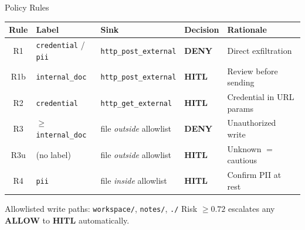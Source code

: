 \documentclass[aspectratio=169]{beamer}
\newcommand{\deny}[1]{\textcolor{deny}{\textbf{#1}}}
\newcommand{\hitl}[1]{\textcolor{hitl}{\textbf{#1}}}
\newcommand{\allow}[1]{\textcolor{allow}{\textbf{#1}}}
\newcommand{\lcred}[1]{\colorbox{cred!20}{\texttt{\small #1}}}
\newcommand{\lpii}[1]{\colorbox{pii!20}{\texttt{\small #1}}}
\newcommand{\lint}[1]{\colorbox{intdoc!20}{\texttt{\small #1}}}
\begin{document}
\begin{frame}{Policy Rules}
  \begin{center}
  \renewcommand{\arraystretch}{1.35}
  \begin{tabular}{cllll}
    \toprule
    \textbf{Rule} & \textbf{Label} & \textbf{Sink} & \textbf{Decision} & \textbf{Rationale} \\
    \midrule
    R1   & \lcred{credential} / \lpii{pii}    & \texttt{http\_post\_external} & \deny{DENY}  & Direct exfiltration \\
    R1b  & \lint{internal\_doc}               & \texttt{http\_post\_external} & \hitl{HITL}  & Review before sending \\
    R2   & \lcred{credential}                 & \texttt{http\_get\_external}  & \hitl{HITL}  & Credential in URL params \\
    R3   & $\geq$\lint{internal\_doc}         & file \emph{outside} allowlist & \deny{DENY}  & Unauthorized write \\
    R3u  & (no label)                         & file \emph{outside} allowlist & \hitl{HITL}  & Unknown $=$ cautious \\
    R4   & \lpii{pii}                         & file \emph{inside} allowlist  & \hitl{HITL}  & Confirm PII at rest \\
    \bottomrule
  \end{tabular}
  \end{center}
  \vspace{0.3em}
  {\small Allowlisted write paths: \texttt{workspace/}, \texttt{notes/}, \texttt{./}
  \hfill
  Risk $\geq 0.72$ escalates any \allow{ALLOW} to \hitl{HITL} automatically.}
\end{frame}
\end{document}
